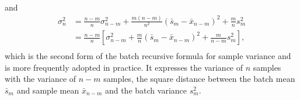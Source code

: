 \documentclass{article}
\begin{document}
and
\begin{equation}
  \begin{aligned}
    \sigma_n^2
    &=\frac{n-m}{n}\sigma_{n-m}^2+\frac{m(n-m)}{n^2}(\bar{s}_m-\bar{x}_{n-m})^2+\frac{m}{n}s_m^2\\
    &=\frac{n-m}{n}\left[\sigma_{n-m}^2+\frac{m}{n}(\bar{s}_m-\bar{x}_{n-m})^2+\frac{m}{n-m}s_m^2\right],\\
  \end{aligned}
\end{equation}
which is the second form of the batch recursive formula for sample variance and is more frequently adopted in practice. It expresses the variance of $n$ samples with the variance of $n-m$ samples, the square distance between the batch mean $\bar{s}_m$ and sample mean $\bar{x}_{n-m}$ and the batch variance $s_m^2$.
\end{document}
